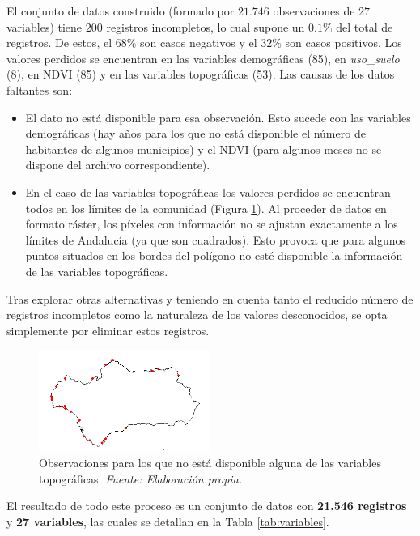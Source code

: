 \documentclass[12pt,a4paper,]{book}
\numberwithin{dummy}{section}
\theoremstyle{ocrenumbox}
\theoremstyle{blacknumex}
\theoremstyle{blacknumbox}
\theoremstyle{ocrenum}
\theoremstyle{ocrenum}
\begin{document}
El conjunto de datos construido (formado por \(21.746\) observaciones de
\(27\) variables) tiene \(200\) registros incompletos, lo cual supone un
\(0.1\%\) del total de registros. De estos, el \(68\%\) son casos
negativos y el \(32\%\) son casos positivos. Los valores perdidos se
encuentran en las variables demográficas (85), en \emph{uso\_suelo} (8),
en NDVI (85) y en las variables topográficas (53). Las causas de los
datos faltantes son:

\begin{itemize}
\item
  El dato no está disponible para esa observación. Esto sucede con las
  variables demográficas (hay años para los que no está disponible el
  número de habitantes de algunos municipios) y el NDVI (para algunos
  meses no se dispone del archivo correspondiente).
\item
  En el caso de las variables topográficas los valores perdidos se
  encuentran todos en los límites de la comunidad (Figura
  \ref{fig:nas_topograficas}). Al proceder de datos en formato ráster,
  los píxeles con información no se ajustan exactamente a los límites de
  Andalucía (ya que son cuadrados). Esto provoca que para algunos puntos
  situados en los bordes del polígono no esté disponible la información
  de las variables topográficas.
\end{itemize}

Tras explorar otras alternativas y teniendo en cuenta tanto el reducido
número de registros incompletos como la naturaleza de los valores
desconocidos, se opta simplemente por eliminar estos registros.

\begin{figure}[htb]
\centering
\includegraphics[width=0.5\textwidth]{graficos/nas_topograficas.png}
\caption[Observaciones para los que no está disponible alguna de las variables topográficas]{Observaciones para los que no está disponible alguna de las variables topográficas. \it Fuente: Elaboración propia.}
\label{fig:nas_topograficas}
\end{figure}

El resultado de todo este proceso es un conjunto de datos con
\textbf{21.546 registros} y \textbf{27 variables}, las cuales se
detallan en la Tabla \ref{tab:variables}.
\end{document}
